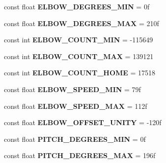 \begin{DoxyCompactItemize}
const float {\bfseries E\+L\+B\+O\+W\+\_\+\+D\+E\+G\+R\+E\+E\+S\+\_\+\+M\+IN} = 0f
\item 
\mbox{\label{class_scorbot_e_r_i_x_a3ea2ead702e1e405597f075adec13756}} 
const float {\bfseries E\+L\+B\+O\+W\+\_\+\+D\+E\+G\+R\+E\+E\+S\+\_\+\+M\+AX} = 210f
\item 
\mbox{\label{class_scorbot_e_r_i_x_a0b49ee03e8097f6e7d1dd716c6c8d880}} 
const int {\bfseries E\+L\+B\+O\+W\+\_\+\+C\+O\+U\+N\+T\+\_\+\+M\+IN} = -\/115649
\item 
\mbox{\label{class_scorbot_e_r_i_x_a68f8c9ec65f9a9e0c471f0525d49b74c}} 
const int {\bfseries E\+L\+B\+O\+W\+\_\+\+C\+O\+U\+N\+T\+\_\+\+M\+AX} = 139121
\item 
\mbox{\label{class_scorbot_e_r_i_x_a5a764a3f7db0a23f0e8b2e571fddfef5}} 
const int {\bfseries E\+L\+B\+O\+W\+\_\+\+C\+O\+U\+N\+T\+\_\+\+H\+O\+ME} = 17518
\item 
\mbox{\label{class_scorbot_e_r_i_x_a288e9b0a384a2bc95ebc19a2602e7757}} 
const float {\bfseries E\+L\+B\+O\+W\+\_\+\+S\+P\+E\+E\+D\+\_\+\+M\+IN} = 79f
\item 
\mbox{\label{class_scorbot_e_r_i_x_ab4ecdd199a869328cf465ce33538de35}} 
const float {\bfseries E\+L\+B\+O\+W\+\_\+\+S\+P\+E\+E\+D\+\_\+\+M\+AX} = 112f
\item 
\mbox{\label{class_scorbot_e_r_i_x_abded31985224d9b6cc3bf0d101c691e2}} 
const float {\bfseries E\+L\+B\+O\+W\+\_\+\+O\+F\+F\+S\+E\+T\+\_\+\+U\+N\+I\+TY} = -\/120f
\item 
\mbox{\label{class_scorbot_e_r_i_x_ab8b9f93fd377ef4e5e17f07b9083f1f4}} 
const float {\bfseries P\+I\+T\+C\+H\+\_\+\+D\+E\+G\+R\+E\+E\+S\+\_\+\+M\+IN} = 0f
\item 
\mbox{\label{class_scorbot_e_r_i_x_a4ab04d513fdffa1f3c249727e820bccb}} 
const float {\bfseries P\+I\+T\+C\+H\+\_\+\+D\+E\+G\+R\+E\+E\+S\+\_\+\+M\+AX} = 196f
\item 
\mbox{\label{class_scorbot_e_r_i_x_a90f3c619f31e7ee212c1b94dc80fdde2}} 

\end{DoxyCompactItemize}
